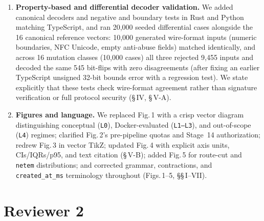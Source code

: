\documentclass[10pt,a4paper]{article}
\begin{document}
\begin{enumerate}
  \item \textbf{Property-based and differential decoder validation.}
  We added canonical decoders and negative and boundary tests in Rust and Python matching TypeScript, and ran 20,000 seeded differential cases alongside the 16 canonical reference vectors: 10,000 generated wire-format inputs (numeric boundaries, NFC Unicode, empty anti-abuse fields) matched identically, and across 16 mutation classes (10,000 cases) all three rejected 9,455 inputs and decoded the same 545 bit-flips with zero disagreements (after fixing an earlier TypeScript unsigned 32-bit bounds error with a regression test). We state explicitly that these tests check wire-format agreement rather than signature verification or full protocol security (\S\,IV, \S\,V-A).

  \item \textbf{Figures and language.}
  We replaced Fig.\,1 with a crisp vector diagram distinguishing conceptual (\texttt{L0}), Docker-evaluated (\texttt{L1--L3}), and out-of-scope (\texttt{L4}) regimes; clarified Fig.\,2's pre-pipeline quotas and Stage~14 authorization; redrew Fig.\,3 in vector TikZ; updated Fig.\,4 with explicit axis units, CIs/IQRs/p95, and text citation (\S\,V-B); added Fig.\,5 for route-cut and \texttt{netem} distributions; and corrected grammar, contractions, and \texttt{created\_at\_ms} terminology throughout (Figs.\,1--5, \S\S\,I--VII).
\end{enumerate}

\section*{Reviewer 2}
\end{document}
